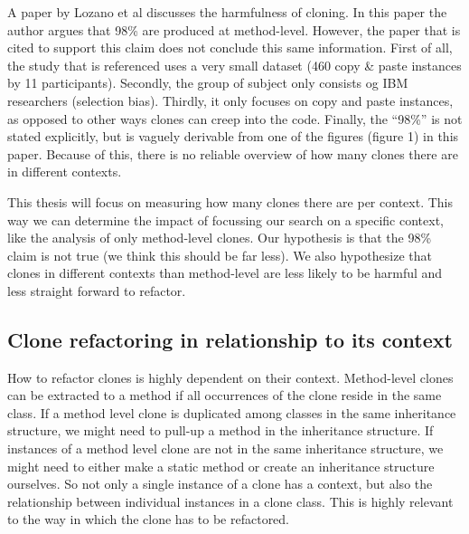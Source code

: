 A paper by Lozano et al \cite{lozano2007evaluating} discusses the harmfulness of cloning. In this paper the author argues that 98\% are produced at method-level. However, the paper that is cited to support this claim \cite{bergman2004ethnographic} does not conclude this same information. First of all, the study that is referenced uses a very small dataset (460 copy \& paste instances by 11 participants). Secondly, the group of subject only consists og IBM researchers (selection bias). Thirdly, it only focuses on copy and paste instances, as opposed to other ways clones can creep into the code. Finally, the ``98\%'' is not stated explicitly, but is vaguely derivable from one of the figures (figure 1) in this paper. Because of this, there is no reliable overview of how many clones there are in different contexts.

This thesis will focus on measuring how many clones there are per context. This way we can determine the impact of focussing our search on a specific context, like the analysis of only method-level clones. Our hypothesis is that the 98\% claim is not true (we think this should be far less). We also hypothesize that clones in different contexts than method-level are less likely to be harmful and less straight forward to refactor.

\subsection{Clone refactoring in relationship to its context}
How to refactor clones is highly dependent on their context. Method-level clones can be extracted to a method \cite{kodhai2013method} if all occurrences of the clone reside in the same class. If a method level clone is duplicated among classes in the same inheritance structure, we might need to pull-up a method in the inheritance structure. If instances of a method level clone are not in the same inheritance structure, we might need to either make a static method or create an inheritance structure ourselves. So not only a single instance of a clone has a context, but also the relationship between individual instances in a clone class. This is highly relevant to the way in which the clone has to be refactored.

